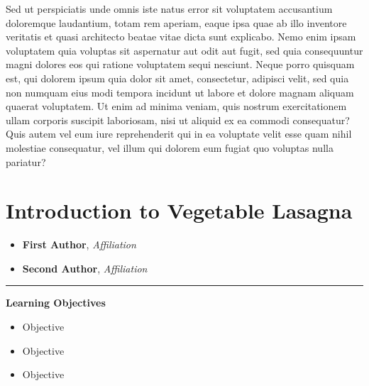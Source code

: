 \documentclass{book}
\providecommand{\tightlist}{%
  \setlength{\itemsep}{0pt}\setlength{\parskip}{0pt}}
\begin{document}
\addtocounter{page}{2}

\newpage

Sed ut perspiciatis unde omnis iste natus error sit voluptatem accusantium
doloremque laudantium, totam rem aperiam, eaque ipsa quae ab illo inventore
veritatis et quasi architecto beatae vitae dicta sunt explicabo. Nemo enim
ipsam voluptatem quia voluptas sit aspernatur aut odit aut fugit, sed quia
consequuntur magni dolores eos qui ratione voluptatem sequi nesciunt. Neque
porro quisquam est, qui dolorem ipsum quia dolor sit amet, consectetur,
adipisci velit, sed quia non numquam eius modi tempora incidunt ut labore et
dolore magnam aliquam quaerat voluptatem. Ut enim ad minima veniam, quis
nostrum exercitationem ullam corporis suscipit laboriosam, nisi ut aliquid ex
ea commodi consequatur? Quis autem vel eum iure reprehenderit qui in ea
voluptate velit esse quam nihil molestiae consequatur, vel illum qui dolorem
eum fugiat quo voluptas nulla pariatur?

\newpage

\setcounter{tocdepth}{3}
\tableofcontents

\mainmatter

\hypertarget{introduction-to-vegetable-lasagna}{%
\chapter{Introduction to Vegetable
Lasagna}\label{introduction-to-vegetable-lasagna}}

\begin{itemize}
\tightlist
\item
  \textbf{First Author}, \emph{Affiliation}
\item
  \textbf{Second Author}, \emph{Affiliation}
\end{itemize}

\begin{center}\rule{0.5\linewidth}{0.5pt}\end{center}

\textbf{Learning Objectives}

\begin{itemize}
\tightlist
\item
  Objective
\item
  Objective
\item
  Objective
\end{itemize}
\end{document}
